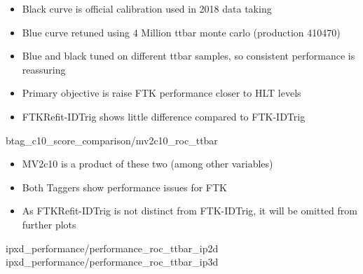     { \begin{itemize}
        \item Black curve is official calibration used in 2018 data taking
        \item Blue curve retuned using 4 Million ttbar monte carlo (production 410470)
        \item Blue and black tuned on different ttbar samples, so consistent performance is reassuring
        \item Primary objective is raise FTK performance closer to HLT levels
        \item FTKRefit-IDTrig shows little difference compared to FTK-IDTrig
    \end{itemize} }
    {btag_c10_score_comparison/mv2c10_roc_ttbar}

    { \begin{itemize}
        \item MV2c10 is a product of these two (among other variables)
        \item Both Taggers show performance issues for FTK
        \item As FTKRefit-IDTrig is not distinct from FTK-IDTrig,
            it will be omitted from further plots
    \end{itemize} }
    {ipxd_performance/performance_roc_ttbar_ip2d}
    {ipxd_performance/performance_roc_ttbar_ip3d}
